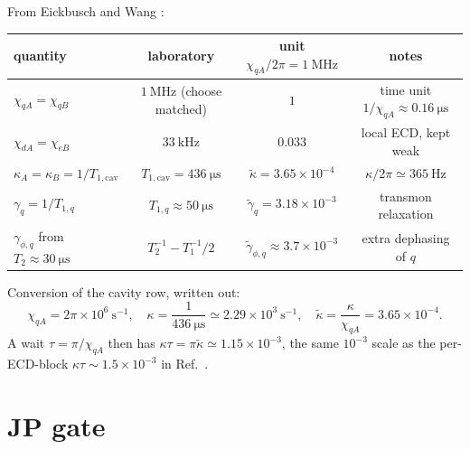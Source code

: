 \documentclass[11pt]{article}
\begin{document}
From Eickbusch \cite{Eickbusch2022} and Wang \cite{Wang2016}:
\begin{center}
\small
\renewcommand{\arraystretch}{1.2}
\begin{tabular}{lccc}
\toprule
quantity & laboratory & unit $\chi_{qA}/2\pi=1~\mathrm{MHz}$ & notes\\
\midrule
$\chi_{qA}=\chi_{qB}$
  & $1~\mathrm{MHz}$ (choose matched)
  & $1$
  & time unit $1/\chi_{qA}\approx 0.16~\mathrm{\mu s}$\\
$\chi_{dA}=\chi_{eB}$
  & $33~\mathrm{kHz}$ \cite{Eickbusch2022}
  & $0.033$
  & local ECD, kept weak\\
$\kappa_A=\kappa_B=1/T_{1,\mathrm{cav}}$
  & $T_{1,\mathrm{cav}}=436~\mathrm{\mu s}$
  & $\tilde\kappa=3.65\times10^{-4}$
  & $\kappa/2\pi\simeq365~\mathrm{Hz}$ \cite{Dutta2025}\\
$\gamma_q=1/T_{1,q}$
  & $T_{1,q}\approx50~\mathrm{\mu s}$
  & $\tilde\gamma_q=3.18\times10^{-3}$
  & transmon relaxation\\
$\gamma_{\phi,q}$ from $T_{2}\approx30~\mathrm{\mu s}$
  & $T_{2}^{-1}-T_{1}^{-1}/2$
  & $\tilde\gamma_{\phi,q}\approx3.7\times10^{-3}$
  & extra dephasing of $q$\\
\bottomrule
\end{tabular}
\end{center}
Conversion of the cavity row, written out:
\begin{equation}
\chi_{qA}=2\pi\times10^{6}~\mathrm{s}^{-1},\quad
\kappa=\frac{1}{436~\mathrm{\mu s}}\simeq2.29\times10^{3}~\mathrm{s}^{-1},\quad
\tilde\kappa=\frac{\kappa}{\chi_{qA}}=3.65\times10^{-4}.
\end{equation}
A wait $\tau=\pi/\chi_{qA}$ then has $\kappa\tau=\pi\tilde\kappa\simeq1.15\times10^{-3}$,
the same $10^{-3}$ scale as the per-ECD-block $\kappa\tau\sim1.5\times10^{-3}$
in Ref.~\cite{Dutta2025}.

\section{JP gate}
\end{document}
